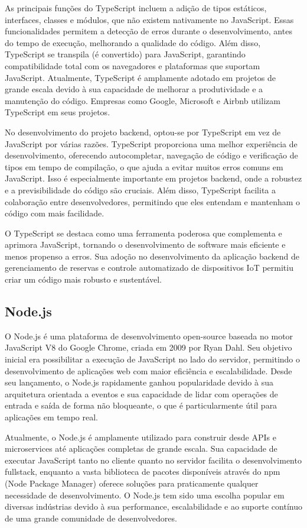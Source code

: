 As principais funções do TypeScript incluem a adição de tipos estáticos, interfaces, classes e módulos, que não existem nativamente no JavaScript. Essas funcionalidades permitem a detecção de erros durante o desenvolvimento, antes do tempo de execução, melhorando a qualidade do código. Além disso, TypeScript se transpila (é convertido) para JavaScript, garantindo compatibilidade total com os navegadores e plataformas que suportam JavaScript. Atualmente, TypeScript é amplamente adotado em projetos de grande escala devido à sua capacidade de melhorar a produtividade e a manutenção do código. Empresas como Google, Microsoft e Airbnb utilizam TypeScript em seus projetos.

No desenvolvimento do projeto backend, optou-se por TypeScript em vez de JavaScript por várias razões. TypeScript proporciona uma melhor experiência de desenvolvimento, oferecendo autocompletar, navegação de código e verificação de tipos em tempo de compilação, o que ajuda a evitar muitos erros comuns em JavaScript. Isso é especialmente importante em projetos backend, onde a robustez e a previsibilidade do código são cruciais. Além disso, TypeScript facilita a colaboração entre desenvolvedores, permitindo que eles entendam e mantenham o código com mais facilidade.

O TypeScript se destaca como uma ferramenta poderosa que complementa e aprimora JavaScript, tornando o desenvolvimento de software mais eficiente e menos propenso a erros. Sua adoção no desenvolvimento da aplicação backend de gerenciamento de reservas e controle automatizado de dispositivos IoT permitiu criar um código mais robusto e sustentável.

\subsection{Node.js}

O Node.js é uma plataforma de desenvolvimento open-source baseada no motor JavaScript V8 do Google Chrome, criada em 2009 por Ryan Dahl. Seu objetivo inicial era possibilitar a execução de JavaScript no lado do servidor, permitindo o desenvolvimento de aplicações web com maior eficiência e escalabilidade. Desde seu lançamento, o Node.js rapidamente ganhou popularidade devido à sua arquitetura orientada a eventos e sua capacidade de lidar com operações de entrada e saída de forma não bloqueante, o que é particularmente útil para aplicações em tempo real.

Atualmente, o Node.js é amplamente utilizado para construir desde APIs e microservices até aplicações completas de grande escala. Sua capacidade de executar JavaScript tanto no cliente quanto no servidor facilita o desenvolvimento fullstack, enquanto a vasta biblioteca de pacotes disponíveis através do npm (Node Package Manager) oferece soluções para praticamente qualquer necessidade de desenvolvimento. O Node.js tem sido uma escolha popular em diversas indústrias devido à sua performance, escalabilidade e ao suporte contínuo de uma grande comunidade de desenvolvedores.

